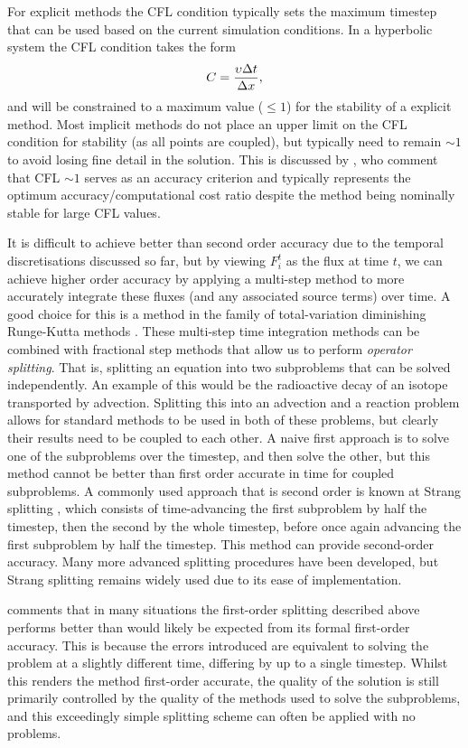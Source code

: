For explicit methods the CFL condition typically sets the maximum timestep that can be used based on the current simulation conditions.
In a hyperbolic system the CFL condition takes the form
\begin{equation}
    C = \frac{\upsilon\Delta t}{\Delta x},
\end{equation}
and will be constrained to a maximum value ($\leq 1$) for the stability of a  explicit method.
Most implicit methods do not place an upper limit on the CFL condition for stability (as all points are coupled), but typically need to remain $\sim 1$ to avoid losing fine detail in the solution.
This is discussed by \citet{Viallet2011}, who comment that CFL $\sim 1$ serves as an accuracy criterion and typically represents the optimum accuracy/computational cost ratio despite the method being nominally stable for large CFL values.

It is difficult to achieve better than second order accuracy due to the temporal discretisations discussed so far, but by viewing $F_i^t$ as the flux at time $t$, we can achieve higher order accuracy by applying a multi-step method to more accurately integrate these fluxes (and any associated source terms) over time.
A good choice for this is a method in the family of total-variation diminishing Runge-Kutta methods \citep[e.g.][]{Shu1988}.
These multi-step time integration methods can be combined with fractional step methods that allow us to perform \emph{operator splitting}.
That is, splitting an equation into two subproblems that can be solved independently.
An example of this would be the radioactive decay of an isotope transported by advection.
Splitting this into an advection and a reaction problem allows for standard methods to be used in both of these problems, but clearly their results need to be coupled to each other.
A naive first approach is to solve one of the subproblems over the timestep, and then solve the other, but this method cannot be better than first order accurate in time for coupled subproblems.
A commonly used approach that is second order is known at Strang splitting \citep{Strang1968}, which consists of time-advancing the first subproblem by half the timestep, then the second by the whole timestep, before once again advancing the first subproblem by half the timestep.
This method can provide second-order accuracy.
Many more advanced splitting procedures have been developed, but Strang splitting remains widely used due to its ease of implementation.

\citet{LeVeque1997} comments that in many situations the first-order splitting described above performs better than would likely be expected from its formal first-order accuracy.
This is because the errors introduced are equivalent to solving the problem at a slightly different time, differing by up to a single timestep.
Whilst this renders the method first-order accurate, the quality of the solution is still primarily controlled by the quality of the methods used to solve the subproblems, and this exceedingly simple splitting scheme can often be applied with no problems.


